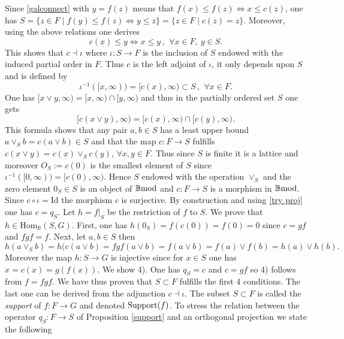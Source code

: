 \documentclass[12pt]{article}
\def\Hom{{\rm Hom}}
\def\id{{\rm id}}
\def\B{{\mathbb B}}
\def\qqq{\,,\,~\forall}
\def\id{{\mbox{Id}}}
\def\Hom {{\mbox{Hom}}}
\def\bmod{{\rm \B mod}}
\begin{document}
  Since \eqref{galconnect} with $y=f(z)$ means that $f(x)\leq f(z)\iff x\leq c(z)$, one has  $S=\{z\in F\mid f(y)\leq f(z)\iff y\leq z\}=\{z\in F \mid c(z)=z \}$. Moreover, using the above relations one derives  
 \begin{equation}\label{closure op}
  c(x)\leq y\iff x\leq y\qqq x\in F, \ y\in S.
  \end{equation}
  This shows that $c\dashv \iota$ where $\iota:S\to F$ is the inclusion of $S$ endowed with the induced partial order in $F$. Thus $c$ is the left adjoint of $\iota$,  it only depends upon $S$ and is defined by 
  $$
  \iota^{-1}([x,\infty))=[c(x),\infty)\subset S\qqq x\in F.
  $$
  One has $[x\vee y,\infty)=[x,\infty)\cap [y,\infty)$ and thus in the partially ordered set $S$ one gets $$
  [c(x\vee y),\infty)=[c(x),\infty)\cap [c(y),\infty).
  $$
   This formula shows that any pair $a,b\in S$ has a least upper bound $a\vee_S b=c(a\vee b)\in S$  and that the map $c:F\to S$ fulfills $c(x\vee y)=c(x)\vee_S c(y)$, $\forall x,y\in F$. Thus since $S$ is finite it is a lattice and moreover $O_S:=c(0)$ is the smallest element of $S$ since $\iota^{-1}([0,\infty))=[c(0),\infty)$. Hence $S$ endowed with the operation $\vee_S$ and the zero element $0_S\in S$ is an object of $\bmod$ and $c:F\to S$ is a morphism in $\bmod$. Since $c\circ \iota=\id$ the morphism $c$ is surjective. By construction and using \eqref{try proj} one has $c=q_S$. Let $h=f\vert_S$ be the restriction of $f$ to $S$. We prove that $h\in \Hom_\B(S,G)$. First, one has $h(0_S)=f(c(0))=f(0)=0$ since $c=gf$ and $fgf=f$. Next, let $a,b\in S$ then 
   $$
   h(a \vee_S b)=h(c(a\vee b)=fgf(a\vee b)=f(a\vee b)=f(a) \vee f(b)=h(a)\vee h(b).
   $$
   Moreover the map $h:S\to G$ is injective since for $x\in S$ one has $x=c(x)=g(f(x))$. \newline
   We show 4). One has $q_S=c$ and $c=gf$ so 4) follows from $f=fgf$. We have thus proven that $S\subset F$ fulfills the first 4 conditions. The last one can be derived from the adjunction $c\dashv \iota$.\endproof
      The subset $S\subset F$ is called the {\em support} of $f: F \to G$ and denoted ${\rm Support}(f)$. To stress the relation between the operator $q_S: F \to S$ of Proposition \ref{support} and an orthogonal projection we state the following
   
\end{document}
